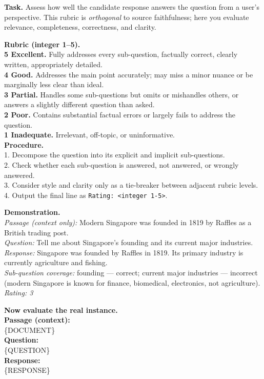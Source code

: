 
\begin{tcolorbox}[
    enhanced,
    colback=white,
    colframe=black,
    arc=5mm,
    boxrule=1pt,
    left=2mm,
    right=2mm,
    top=1mm,
    bottom=1mm
]

\textbf{Task.} Assess how well the candidate response answers the question from a user's perspective. This rubric is \emph{orthogonal} to source faithfulness; here you evaluate relevance, completeness, correctness, and clarity.

\textbf{Rubric (integer 1--5).}\\
\textbf{5 Excellent.} Fully addresses every sub-question, factually correct, clearly written, appropriately detailed.\\
\textbf{4 Good.} Addresses the main point accurately; may miss a minor nuance or be marginally less clear than ideal.\\
\textbf{3 Partial.} Handles some sub-questions but omits or mishandles others, or answers a slightly different question than asked.\\
\textbf{2 Poor.} Contains substantial factual errors or largely fails to address the question.\\
\textbf{1 Inadequate.} Irrelevant, off-topic, or uninformative.\\

\textbf{Procedure.}\\
1. Decompose the question into its explicit and implicit sub-questions.\\
2. Check whether each sub-question is answered, not answered, or wrongly answered.\\
3. Consider style and clarity only as a tie-breaker between adjacent rubric levels.\\
4. Output the final line as \texttt{Rating: <integer 1-5>}.

\textbf{Demonstration.}\\
\emph{Passage (context only):} Modern Singapore was founded in 1819 by Raffles as a British trading post.\\
\emph{Question:} Tell me about Singapore's founding and its current major industries.\\
\emph{Response:} Singapore was founded by Raffles in 1819. Its primary industry is currently agriculture and fishing.\\
\emph{Sub-question coverage:} founding — correct; current major industries — incorrect (modern Singapore is known for finance, biomedical, electronics, not agriculture).\\
\emph{Rating: 3}

\textbf{Now evaluate the real instance.}\\

\textbf{Passage (context):}\\
\{DOCUMENT\}\\

\textbf{Question:}\\
\{QUESTION\}\\

\textbf{Response:}\\
\{RESPONSE\}\\

\end{tcolorbox}

